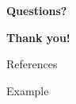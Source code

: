 \documentclass[11pt]{beamer}
\begin{document}
\begin{frame}
\begin{center}
{\Large \textbf{Questions?}}
\end{center}
\end{frame}

\begin{frame}
\begin{center}
{\Large \textbf{Thank you!}}
\end{center}
\end{frame}

\begin{frame}{References}
\begin{tiny}


\end{tiny}
\end{frame}

\begin{frame}{Example}

\end{frame}
\end{document}
